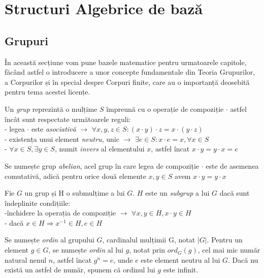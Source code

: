\let\textcircled=\pgftextcircled

\chapter{Structuri Algebrice de bază} 
\section{Grupuri}
\label{sec:sec01}
În această secțiune vom pune bazele matematice pentru urmatoarele capitole, făcând astfel o introducere a unor concepte fundamentale din Teoria Grupurilor, a Corpurilor și în special despre Corpuri finite, care au o importanță deosebită pentru tema acestei licențe.
\begin{dfn}
Un \textit{grup} reprezintă o mulțime $S$ împreună cu o operație de compoziție $\cdot$ astfel încât sunt respectate următoarele reguli:
\\ - legea $\cdot$ este \textit{asociativă} $\rightarrow$ $\forall x, y, z\in S: (x\cdot y)\cdot z = x\cdot (y \cdot z)$
\\ - existența unui element \textit{neutru}, unic $\rightarrow$ $\exists e\in S: x \cdot e = x, \forall x\in S$
\\ - $\forall x\in S, \exists y\in S$, numit \textit{invers} al elementului $x$, astfel încat $x\cdot y = y\cdot x = e$
\end{dfn}

\begin{dfn}
Se numește grup \textit{abelian}, acel grup în care legea de compoziție $\cdot$ este de asemenea comutativă, adică pentru orice două elemente
$x, y \in S$ avem $x \cdot y = y \cdot x$
\end{dfn}

\begin{dfn}
Fie $G$ un grup și H o submulțime a lui $G$. $H$ este un \textit{subgrup} a lui $G$ dacă sunt îndeplinite condițiile:
\\ -închidere la operația de compoziție $\rightarrow$ $\forall x, y \in H, x \cdot y \in H$
\\ - dacă $x \in H \Rightarrow x^{-1} \in H, e \in H$
\end{dfn}

\begin{dfn}
Se numește \textit{ordin} al grupului $G$, cardinalul mulțimii G, notat $|G|$. Pentru un element $g \in G$, se numește \textit{ordin} al lui $g$, notat prin $ord_G(g)$, cel mai
mic număr natural nenul $n$, astfel încat $g^n = e$, unde $e$ este element neutru al lui $G$. Dacă nu există un astfel de număr, spunem că ordinul lui $g$ este infinit.
\end{dfn}

